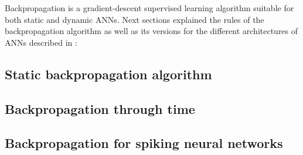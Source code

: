 
\label{sec:generalbackprop}

Backpropagation is a gradient-descent supervised learning algorithm suitable for both static and dynamic ANNs. 
Next sections explained the rules of the backpropagation algorithm as well as its versions for the different architectures of ANNs described in :

\subsection{Static backpropagation algorithm}
\label{subsec:staticbackprop}

\subsection{Backpropagation through time}
\label{subsec:bptt}

\subsection{Backpropagation for spiking neural networks}
\label{subsec:snnbackprop}
